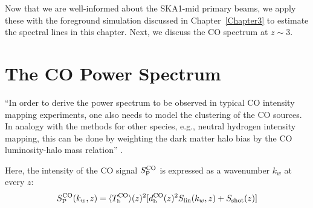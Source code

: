 Now that we are well-informed about the SKA1-mid primary beams, we apply these with the foreground simulation discussed in Chapter~\ref{Chapter3} to estimate the spectral lines
in this chapter. Next, we discuss the CO spectrum at $z\sim3$.

%  
%  
 
 
 \section{The CO Power Spectrum}
 
 \enquote{In order to derive the power spectrum to be observed in typical CO intensity mapping experiments, one also needs to model the clustering of the CO sources. In analogy with the methods for other species, e.g., neutral hydrogen intensity mapping, this can be done by weighting the dark matter halo bias by the CO luminosity-halo mass relation}  \citep{2018MNRAS.475.1477P}.

 
Here, the intensity of the CO signal $S_{\rm P}^{\rm CO}$ is expressed as a wavenumber $k_{w}$ at every $z$:
\begin{equation}  \label{eq:ps1}
S_{\rm P}^{\rm CO}(k_{w},z) = \langle T_{\rm b}^{\rm CO} \rangle (z)^{2}[d_{\rm b}^{\rm CO}(z)^{2} S_{\rm lin}(k_{w},z) + S_{\rm shot}(z)] 
\end{equation}

